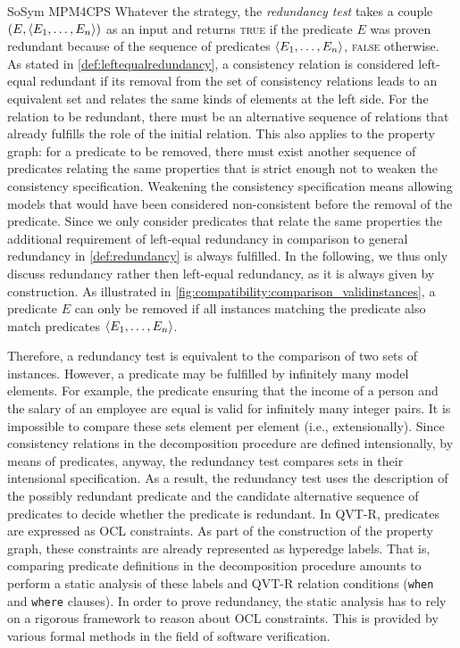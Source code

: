 \begin{copiedFrom}{SoSym MPM4CPS}
Whatever the strategy, the \textit{redundancy test} takes a couple $(E, \langle E_1, \dots, E_n \rangle)$ as an input and returns \textsc{true} if the predicate $E$ was proven redundant because of the sequence of predicates $\langle E_1, \dots, E_n \rangle$, \textsc{false} otherwise. As stated in \autoref{def:leftequalredundancy}, a consistency relation is considered left-equal redundant if its removal from the set of consistency relations leads to an equivalent set and relates the same kinds of elements at the left side. For the relation to be redundant, there must be an alternative sequence of relations that already fulfills the role of the initial relation. This also applies to the property graph: for a predicate to be removed, there must exist another sequence of predicates relating the same properties that is strict enough not to weaken the consistency specification. Weakening the consistency specification means allowing models that would have been considered non-consistent before the removal of the predicate. 
Since we only consider predicates that relate the same properties the additional requirement of left-equal redundancy in comparison to general redundancy in \autoref{def:redundancy} is always fulfilled. In the following, we thus only discuss redundancy rather then left-equal redundancy, as it is always given by construction.
As illustrated in \autoref{fig:compatibility:comparison_validinstances}, a predicate $E$ can only be removed if all instances matching the predicate also match predicates $\langle E_1, \dots, E_n \rangle$.

Therefore, a redundancy test is equivalent to the comparison of two sets of instances. However, a predicate may be fulfilled by infinitely many model elements. For example, the predicate ensuring that the income of a person and the salary of an employee are equal is valid for infinitely many integer pairs. It is impossible to compare these sets element per element (i.e., extensionally). 
Since consistency relations in the decomposition procedure are defined intensionally, by means of predicates, anyway, the redundancy test compares sets in their intensional specification.
As a result, the redundancy test uses the description of the possibly redundant predicate and the candidate alternative sequence of predicates to decide whether the predicate is redundant.  
In QVT-R, predicates are expressed as OCL constraints. As part of the construction of the property graph, these constraints are already represented as hyperedge labels. That is, comparing predicate definitions in the decomposition procedure amounts to perform a static analysis of these labels and QVT-R relation conditions (\texttt{when} and \texttt{where} clauses). In order to prove redundancy, the static analysis has to rely on a rigorous framework to reason about OCL constraints. This is provided by various formal methods in the field of software verification.


\end{copiedFrom}
